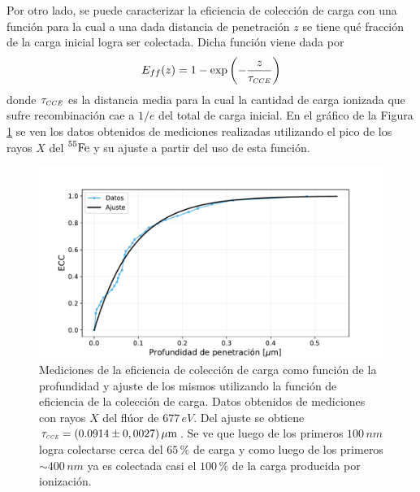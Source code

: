 Por otro lado, se puede caracterizar la eficiencia de colección de carga con una función para la cual a una dada distancia de penetración $z$ se tiene qué fracción de la carga inicial logra ser colectada. Dicha función viene dada por
\begin{equation}
    E_{ff}(z) = 1 - 
    \exp
    \left(
        -\frac{z}{\tau_{\scaleto{CCE}{4pt}}}
    \right)
        \label{ec:funcionCCE}
\end{equation}
donde $\tau_{\scaleto{CCE}{4pt}}$ es la distancia media para la cual la cantidad de carga ionizada que sufre recombinación cae a $1/e$ del total de carga inicial. En el gráfico de la Figura \ref{fig:EficienciaCC}\cite{PCC-CCE-interno} se ven los datos obtenidos de mediciones realizadas utilizando el pico de los rayos $X$ del $\prescript{55}{}{\mbox{Fe}}$ y su ajuste a partir del uso de esta función.
\begin{figure}[h]
    \centering
        \includegraphics[scale=0.5]{Figs/CCE_vs_z.pdf}
    \caption{Mediciones de la eficiencia de colección de carga como función de la profundidad y ajuste de los mismos utilizando la función de eficiencia de la colección de carga. Datos obtenidos de mediciones con rayos $X$ del flúor de $677\,\si{eV}$. Del ajuste se obtiene $\tau_{\scaleto{CCE}{3pt}} = (0.0914 \pm 0,0027)\,\si{\mu m} $. Se ve que luego de los primeros $100\,\si{nm}$ logra colectarse cerca del $65\,\%$ de carga y como luego de los primeros $\sim 400\,\si{nm}$ ya es colectada casi el $100\,\%$ de la carga producida por ionización.}
    \label{fig:EficienciaCC}
\end{figure}


